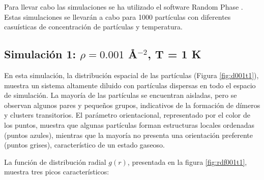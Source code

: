 Para llevar cabo las simulaciones se ha utilizado el software Random Phase \cite{rf2022}. Estas simulaciones se llevarán a cabo para 1000 partículas con diferentes casuísticas de concentración de partículas y temperatura. 


\subsection{Simulación 1: $\rho = 0.001$ \AA$^{-2}$, T = 1 K}

En esta simulación, la distribución espacial de las partículas (Figura \ref{fig:d001t1}), muestra un sistema altamente diluido con partículas dispersas en todo el espacio de simulación. La mayoría de las partículas se encuentran aisladas, pero se observan algunos pares y pequeños grupos, indicativos de la formación de dímeros y clusters transitorios. El parámetro orientacional, representado por el color de los puntos, muestra que algunas partículas forman estructuras locales ordenadas (puntos azules), mientras que la mayoría no presenta una orientación preferente (puntos grises), característico de un estado gaseoso.

\vspace{\baselineskip}

La función de distribución radial $g(r)$, presentada en la figura \ref{fig:rdf001t1}, muestra tres picos característicos:	

